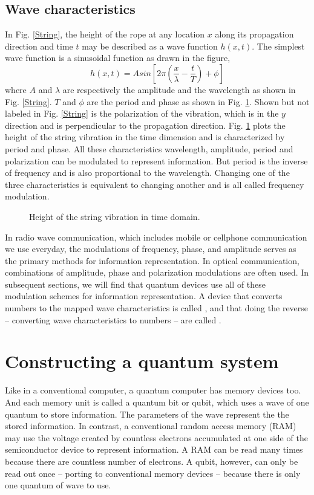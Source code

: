 \documentclass[Letter,11pt]{book}
\begin{document}
\subsection{Wave characteristics}
In Fig. \ref{String}, the height of the rope at any location $x$ along its propagation direction and time $t$ may be described as a wave function $h(x,t)$. The simplest wave function is a sinusoidal function as drawn in the figure,
\begin{equation}
    h(x,t) = A sin[2\pi (\frac x \lambda - \frac t T) +\phi]
\end{equation}
where $A$ and $\lambda$ are respectively the amplitude and the wavelength as shown in Fig. \ref{String}. $T$ and $\phi$ are the period and phase as shown in Fig. \ref{Wave}. Shown but not labeled in Fig. \ref{String} is the polarization of the vibration, which is in the $y$ direction and is perpendicular to the propagation direction. Fig. \ref{Wave} plots the height of the string vibration in the time dimension and is characterized by period and phase. All these characteristics wavelength, amplitude, period and polarization can be modulated to represent information. But period is the inverse of frequency and is also proportional to the wavelength. Changing one of the three characteristics is equivalent to changing another and is all called frequency modulation.

\begin{figure}[ht]\label{Wave}

\caption{Height of the string vibration in time domain.}
\end{figure}

In radio wave communication, which includes mobile or cellphone communication we use everyday, the modulations of frequency, phase, and amplitude serves as the primary methods for information representation. In optical communication, combinations of amplitude, phase and polarization modulations are often used. In subsequent sections, we will find that quantum devices use all of these modulation schemes for information representation. A device that converts numbers to the mapped wave characteristics is called , and that doing the reverse -- converting wave characteristics to numbers -- are called .

\section{Constructing a quantum system}
Like in a conventional computer, a quantum computer has memory devices too. And each memory unit is called a quantum bit or qubit, which uses  a wave of one quantum to store information. The parameters of the wave represent the the stored information. In contrast, a conventional random access memory (RAM) may use the voltage created by countless electrons accumulated at one side of the semiconductor device to represent information. A RAM can be read many times because there are countless number of electrons. A qubit, however, can only be read out once -- porting to conventional memory devices -- because there is only one quantum of wave to use.
\end{document}
